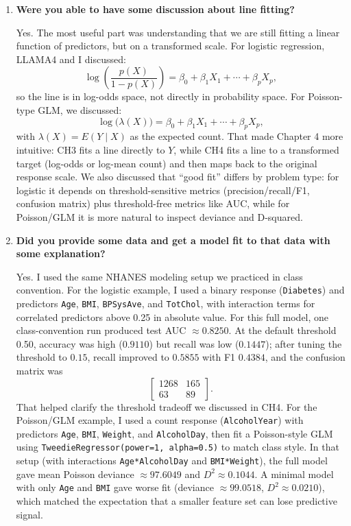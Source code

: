 \documentclass[10pt]{extarticle}
\begin{document}
\begin{enumerate}[label=\arabic*., leftmargin=2em]
\item \textbf{Were you able to have some discussion about line fitting?}

Yes. The most useful part was understanding that we are still fitting a linear function of predictors, but on a transformed scale. For logistic regression, LLAMA4 and I discussed:
\[
\log\!\left(\frac{p(X)}{1-p(X)}\right)=\beta_0+\beta_1X_1+\cdots+\beta_pX_p,
\]
so the line is in log-odds space, not directly in probability space. For Poisson-type GLM, we discussed:
\[
\log\!\big(\lambda(X)\big)=\beta_0+\beta_1X_1+\cdots+\beta_pX_p,
\]
with \(\lambda(X)=E(Y\mid X)\) as the expected count. That made Chapter 4 more intuitive: CH3 fits a line directly to \(Y\), while CH4 fits a line to a transformed target (log-odds or log-mean count) and then maps back to the original response scale. We also discussed that ``good fit'' differs by problem type: for logistic it depends on threshold-sensitive metrics (precision/recall/F1, confusion matrix) plus threshold-free metrics like AUC, while for Poisson/GLM it is more natural to inspect deviance and D-squared.

\item \textbf{Did you provide some data and get a model fit to that data with some explanation?}

Yes. I used the same NHANES modeling setup we practiced in class convention. For the logistic example, I used a binary response (\texttt{Diabetes}) and predictors \texttt{Age}, \texttt{BMI}, \texttt{BPSysAve}, and \texttt{TotChol}, with interaction terms for correlated predictors above 0.25 in absolute value. For this full model, one class-convention run produced test AUC \(\approx 0.8250\). At the default threshold 0.50, accuracy was high (\(0.9110\)) but recall was low (\(0.1447\)); after tuning the threshold to \(0.15\), recall improved to \(0.5855\) with F1 \(0.4384\), and the confusion matrix was
\[
\begin{bmatrix}
1268 & 165\\
63 & 89
\end{bmatrix}.
\]
That helped clarify the threshold tradeoff we discussed in CH4. For the Poisson/GLM example, I used a count response (\texttt{AlcoholYear}) with predictors \texttt{Age}, \texttt{BMI}, \texttt{Weight}, and \texttt{AlcoholDay}, then fit a Poisson-style GLM using \texttt{TweedieRegressor(power=1, alpha=0.5)} to match class style. In that setup (with interactions \texttt{Age*AlcoholDay} and \texttt{BMI*Weight}), the full model gave mean Poisson deviance \(\approx 97.6049\) and \(D^2\approx 0.1044\). A minimal model with only \texttt{Age} and \texttt{BMI} gave worse fit (deviance \(\approx 99.0518\), \(D^2\approx 0.0210\)), which matched the expectation that a smaller feature set can lose predictive signal.



\end{enumerate}
\end{document}
